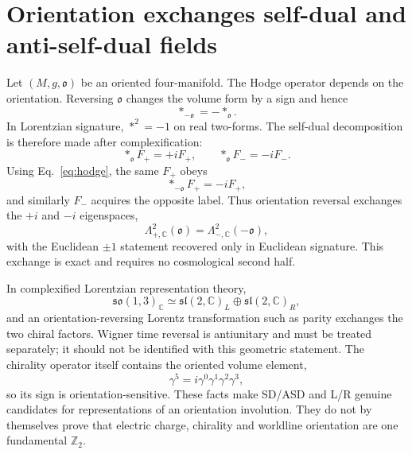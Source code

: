 \documentclass[11pt]{article}
\theoremstyle{definition}\newtheorem{definition}[theorem]{Definition}
\theoremstyle{remark}\newtheorem{remark}[theorem]{Remark}\newtheorem{conjecture}[theorem]{Conjecture}
\begin{document}
\section{Orientation exchanges self-dual and anti-self-dual fields}
Let $(M,g,\mathfrak o)$ be an oriented four-manifold. The Hodge operator depends on the orientation. Reversing $\mathfrak o$ changes the volume form by a sign and hence
\begin{equation}\label{eq:hodge}
 *_{-\mathfrak o}=-*_{\mathfrak o}.
\end{equation}
In Lorentzian signature, $*^2=-1$ on real two-forms. The self-dual decomposition is therefore made after complexification:
\begin{equation}\label{eq:lorhodge}
 *_{\mathfrak o}F_+=+iF_+,
 \qquad
 *_{\mathfrak o}F_-=-iF_-.
\end{equation}
Using Eq.~\eqref{eq:hodge}, the same $F_+$ obeys
\begin{equation}
 *_{-\mathfrak o}F_+=-iF_+,
\end{equation}
and similarly $F_-$ acquires the opposite label. Thus orientation reversal exchanges the $+i$ and $-i$ eigenspaces,
\begin{equation}
 \Lambda^2_{+,\mathbb C}(\mathfrak o)
 =\Lambda^2_{-,\mathbb C}(-\mathfrak o),
\end{equation}
with the Euclidean $\pm1$ statement recovered only in Euclidean signature. This exchange is exact and requires no cosmological second half.

In complexified Lorentzian representation theory,
\begin{equation}
 \mathfrak{so}(1,3)_\mathbb C\simeq
 \mathfrak{sl}(2,\mathbb C)_L\oplus\mathfrak{sl}(2,\mathbb C)_R,
\end{equation}
and an orientation-reversing Lorentz transformation such as parity exchanges the two chiral factors. Wigner time reversal is antiunitary and must be treated separately; it should not be identified with this geometric statement. The chirality operator itself contains the oriented volume element,
\begin{equation}
 \gamma^5=i\gamma^0\gamma^1\gamma^2\gamma^3,
\end{equation}
so its sign is orientation-sensitive. These facts make SD/ASD and L/R genuine candidates for representations of an orientation involution. They do not by themselves prove that electric charge, chirality and worldline orientation are one fundamental $\mathbb Z_2$.
\end{document}
